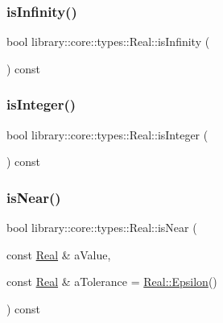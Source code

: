 \mbox{\label{classlibrary_1_1core_1_1types_1_1_real_a4603222d9315aa59355778d66c0b214d}} 
\subsubsection{\texorpdfstring{isInfinity()}{isInfinity()}}
{\footnotesize\ttfamily bool library\+::core\+::types\+::\+Real\+::is\+Infinity (\begin{DoxyParamCaption}{ }\end{DoxyParamCaption}) const}

\mbox{\label{classlibrary_1_1core_1_1types_1_1_real_ad2709f64d24cb119403a0a6d386f5eda}} 
\subsubsection{\texorpdfstring{isInteger()}{isInteger()}}
{\footnotesize\ttfamily bool library\+::core\+::types\+::\+Real\+::is\+Integer (\begin{DoxyParamCaption}{ }\end{DoxyParamCaption}) const}

\mbox{\label{classlibrary_1_1core_1_1types_1_1_real_a59cda3a7c738f0d0244e408dadeb079c}} 
\subsubsection{\texorpdfstring{isNear()}{isNear()}}
{\footnotesize\ttfamily bool library\+::core\+::types\+::\+Real\+::is\+Near (\begin{DoxyParamCaption}\item[{const \mbox{\hyperlink{classlibrary_1_1core_1_1types_1_1_real}{Real}} \&}]{a\+Value,  }\item[{const \mbox{\hyperlink{classlibrary_1_1core_1_1types_1_1_real}{Real}} \&}]{a\+Tolerance = {\ttfamily \mbox{\hyperlink{classlibrary_1_1core_1_1types_1_1_real_a5f3b76a5055cb042c25448b873e39663}{Real\+::\+Epsilon}}()} }\end{DoxyParamCaption}) const}

